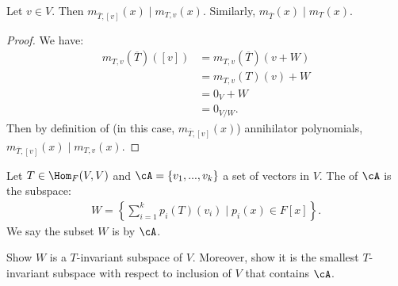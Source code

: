     \begin{lemma}
        Let $v \in V$. Then $m_{\overline{T},[v]}(x) \mid m_{T,v}(x)$. Similarly, $m_{\overline{T}}(x) \mid m_T(x)$.
    \end{lemma}
        \begin{proof}
            We have:
                \begin{equation*}
                \begin{split}
                    m_{T,v}(\overline{T})([v])
                    & = m_{T,v}(\overline{T})(v+W) \\
                    & = m_{T,v}(T)(v) + W \\
                    & = 0_V + W \\
                    & = 0_{V/W}.
                \end{split}
                \end{equation*}
            Then by definition of (in this case, $m_{\overline{T},[v]}(x)$) annihilator polynomials, $m_{\overline{T},[v]}(x) \mid m_{T,v}(x)$.
        \end{proof}

    \begin{definition}
        Let $T \in \Hom_F(V,V)$ and $\cA = \{v_1,...,v_k\}$ a set of vectors in $V$. The  of $\cA$ is the subspace:
            \begin{equation*}
            \begin{split}
                W = \left\{\sum_{i=1}^k p_i(T)(v_i) \mid p_i(x) \in F[x]\right\}.
            \end{split}
            \end{equation*}
        We say the subset $W$ is  by $\cA$.
    \end{definition}

    \begin{exercise}\label{exercise:t-span}
        Show $W$ is a $T$-invariant subspace of $V$. Moreover, show it is the smallest $T$-invariant subspace with respect to inclusion of $V$ that contains $\cA$.
    \end{exercise}


